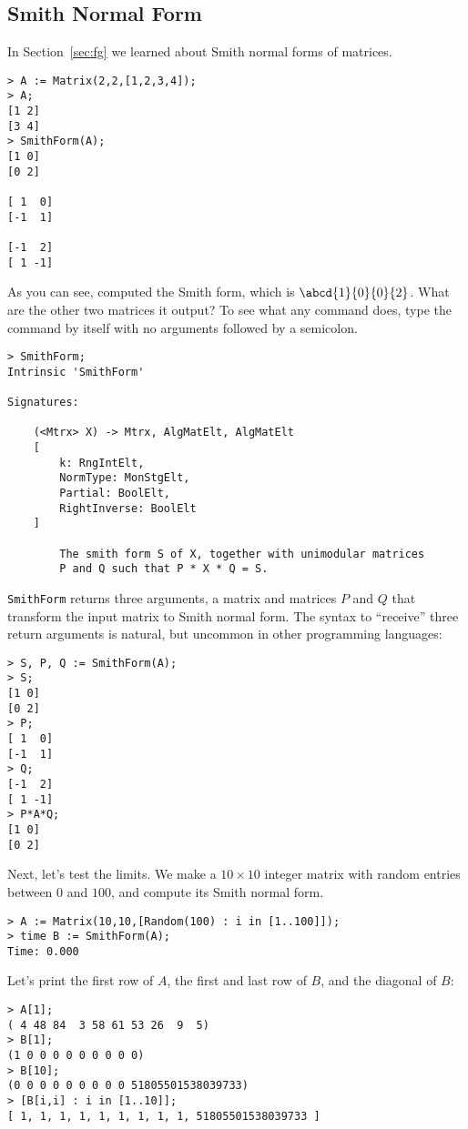 \subsection{Smith Normal Form}
In Section~\ref{sec:fg} we learned about Smith normal forms
of matrices.  
\begin{verbatim}
> A := Matrix(2,2,[1,2,3,4]);
> A;
[1 2]
[3 4]
> SmithForm(A);
[1 0]
[0 2]

[ 1  0]
[-1  1]

[-1  2]
[ 1 -1]
\end{verbatim}
As you can see, \magma{} computed the Smith form, which is 
$\abcd{1}{0}{0}{2}$.  What are the other two matrices
it output?  To see what any \magma{} command does, type
the command by itself with no arguments followed by a
semicolon.
\begin{verbatim}
> SmithForm;
Intrinsic 'SmithForm'

Signatures:

    (<Mtrx> X) -> Mtrx, AlgMatElt, AlgMatElt
    [
        k: RngIntElt, 
        NormType: MonStgElt, 
        Partial: BoolElt, 
        RightInverse: BoolElt
    ]

        The smith form S of X, together with unimodular matrices 
        P and Q such that P * X * Q = S.
\end{verbatim}
{\tt SmithForm} returns three arguments, a matrix and
matrices $P$ and $Q$ that transform the input matrix to Smith normal
form.  The syntax to ``receive'' three return arguments is natural,
but uncommon in other programming languages:
\begin{verbatim}
> S, P, Q := SmithForm(A);
> S;
[1 0]
[0 2]
> P;
[ 1  0]
[-1  1]
> Q;
[-1  2]
[ 1 -1]
> P*A*Q;
[1 0]
[0 2]
\end{verbatim}
Next, let's test the limits.  We make a $10\times 10$ 
integer matrix with random entries between $0$ and $100$,
and compute its Smith normal form.
\begin{verbatim}
> A := Matrix(10,10,[Random(100) : i in [1..100]]);
> time B := SmithForm(A);  
Time: 0.000
\end{verbatim}
Let's print the first row of $A$, the first and last
row of $B$, and the diagonal of $B$:
\begin{verbatim}
> A[1];
( 4 48 84  3 58 61 53 26  9  5)
> B[1];
(1 0 0 0 0 0 0 0 0 0)
> B[10];
(0 0 0 0 0 0 0 0 0 51805501538039733)
> [B[i,i] : i in [1..10]];
[ 1, 1, 1, 1, 1, 1, 1, 1, 1, 51805501538039733 ]
\end{verbatim}

